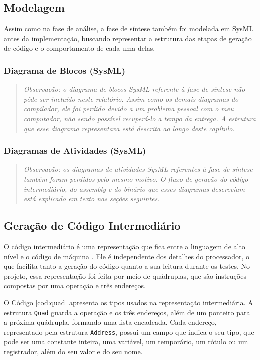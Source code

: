 \documentclass[
	12pt,				%
	oneside,
	a4paper,			%
	english,			%
	french,				%
	spanish,			%
	brazil,				%
	]{abntex2}
\begin{document}
\subsection{Modelagem}
Assim como na fase de análise, a fase de síntese também foi modelada em SysML antes da implementação, buscando representar a estrutura das etapas de geração de código e o comportamento de cada uma delas.

\subsubsection{Diagrama de Blocos (SysML)}
\begin{quote}
\textit{Observação: o diagrama de blocos SysML referente à fase de síntese não pôde ser incluído neste relatório. Assim como os demais diagramas do compilador, ele foi perdido devido a um problema pessoal com o meu computador, não sendo possível recuperá-lo a tempo da entrega. A estrutura que esse diagrama representava está descrita ao longo deste capítulo.}
\end{quote}

\subsubsection{Diagramas de Atividades (SysML)}
\begin{quote}
\textit{Observação: os diagramas de atividades SysML referentes à fase de síntese também foram perdidos pelo mesmo motivo. O fluxo de geração do código intermediário, do assembly e do binário que esses diagramas descreviam está explicado em texto nas seções seguintes.}
\end{quote}

\subsection{Geração de Código Intermediário}
O código intermediário é uma representação que fica entre a linguagem de alto nível e o código de máquina \cite{aho2008}. Ele é independente dos detalhes do processador, o que facilita tanto a geração do código quanto a sua leitura durante os testes. No projeto, essa representação foi feita por meio de quádruplas, que são instruções compostas por uma operação e três endereços.

O Código \ref{cod:quad} apresenta os tipos usados na representação intermediária. A estrutura \texttt{Quad} guarda a operação e os três endereços, além de um ponteiro para a próxima quádrupla, formando uma lista encadeada. Cada endereço, representado pela estrutura \texttt{Address}, possui um campo que indica o seu tipo, que pode ser uma constante inteira, uma variável, um temporário, um rótulo ou um registrador, além do seu valor e do seu nome.
\end{document}
